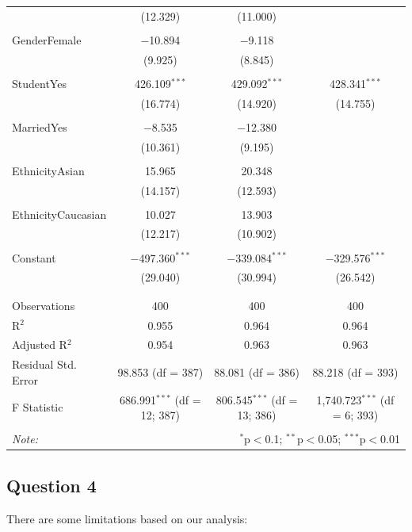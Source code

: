 \documentclass[11pt]{article}
\begin{document}
{\begin{table}[H]
{\begin{tabular}{@{\extracolsep{5pt}}lccc}
  & (12.329) & (11.000) &  \\ 
  & & & \\ 
 GenderFemale & $-$10.894 & $-$9.118 &  \\ 
  & (9.925) & (8.845) &  \\ 
  & & & \\ 
 StudentYes & 426.109$^{***}$ & 429.092$^{***}$ & 428.341$^{***}$ \\ 
  & (16.774) & (14.920) & (14.755) \\ 
  & & & \\ 
 MarriedYes & $-$8.535 & $-$12.380 &  \\ 
  & (10.361) & (9.195) &  \\ 
  & & & \\ 
 EthnicityAsian & 15.965 & 20.348 &  \\ 
  & (14.157) & (12.593) &  \\ 
  & & & \\ 
 EthnicityCaucasian & 10.027 & 13.903 &  \\ 
  & (12.217) & (10.902) &  \\ 
  & & & \\ 
 Constant & $-$497.360$^{***}$ & $-$339.084$^{***}$ & $-$329.576$^{***}$ \\ 
  & (29.040) & (30.994) & (26.542) \\ 
  & & & \\ 
\hline \\[-1.8ex] 
Observations & 400 & 400 & 400 \\ 
R$^{2}$ & 0.955 & 0.964 & 0.964 \\ 
Adjusted R$^{2}$ & 0.954 & 0.963 & 0.963 \\ 
Residual Std. Error & 98.853 (df = 387) & 88.081 (df = 386) & 88.218 (df = 393) \\ 
F Statistic & 686.991$^{***}$ (df = 12; 387) & 806.545$^{***}$ (df = 13; 386) & 1,740.723$^{***}$ (df = 6; 393) \\ 
\hline 
\hline \\[-1.8ex] 
\textit{Note:}  & \multicolumn{3}{r}{$^{*}$p$<$0.1; $^{**}$p$<$0.05; $^{***}$p$<$0.01} \\ 
\end{tabular} 
}
\end{table}

\subsection*{Question 4}
There are some limitations based on our analysis:\\

}
\end{document}
